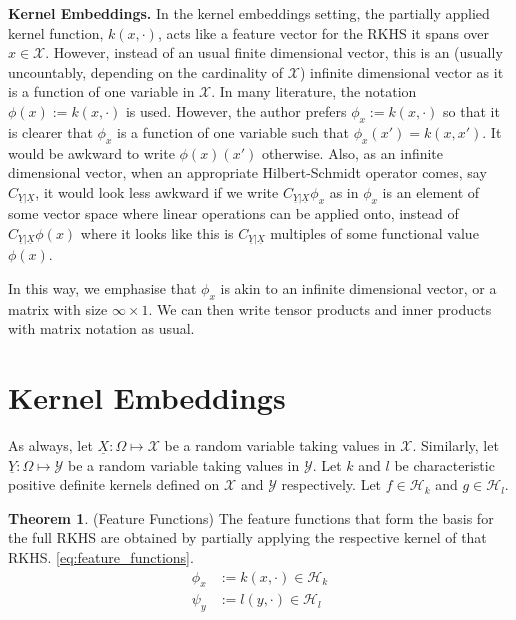 \documentclass[twoside]{article} \usepackage{aistats2017}
\theoremstyle{definition}
\newtheorem{theorem}{Theorem}[section]
\newcommand{\rv}[1]{\underline{#1}}
\newcommand{\Hk}{\mathcal{H}_{k}}
\newcommand{\Hl}{\mathcal{H}_{l}}
\begin{document}
	\textbf{Kernel Embeddings.} In the kernel embeddings setting, the partially applied kernel function, $k(x, \cdot)$, acts like a feature vector for the RKHS it spans over $x \in \mathcal{X}$. However, instead of an usual finite dimensional vector, this is an (usually uncountably, depending on the cardinality of $\mathcal{X}$) infinite dimensional vector as it is a function of one variable in $\mathcal{X}$. In many literature, the notation $\phi(x) := k(x, \cdot)$ is used. However, the author prefers $\phi_{x} := k(x, \cdot)$ so that it is clearer that $\phi_{x}$ is a function of one variable such that $\phi_{x}(x') = k(x, x')$. It would be awkward to write $\phi(x)(x')$ otherwise. Also, as an infinite dimensional vector, when an appropriate Hilbert-Schmidt operator comes, say $C_{\rv{Y} | \rv{X}}$, it would look less awkward if we write $C_{\rv{Y} | \rv{X}} \phi_{x}$ as in $\phi_{x}$ is an element of some vector space where linear operations can be applied onto, instead of $C_{\rv{Y} | \rv{X}} \phi(x)$ where it looks like this is $C_{\rv{Y} | \rv{X}}$ multiples of some functional value $\phi(x)$.
	
	In this way, we emphasise that $\phi_{x}$ is akin to an infinite dimensional vector, or a matrix with size $\infty \times 1$. We can then write tensor products and inner products with matrix notation as usual.
	
\section{Kernel Embeddings}
	
	As always, let $\rv{X} : \Omega \mapsto \mathcal{X}$ be a random variable taking values in $\mathcal{X}$. Similarly, let $\rv{Y} : \Omega \mapsto \mathcal{Y}$ be a random variable taking values in $\mathcal{Y}$. Let $k$ and $l$ be characteristic positive definite kernels defined on $\mathcal{X}$ and $\mathcal{Y}$ respectively. Let $f \in \Hk$ and $g \in \Hl$.
		

	\begin{theorem} \label{thm:feature_functions}
		(Feature Functions)
		The feature functions that form the basis for the full RKHS are obtained by partially applying the respective kernel of that RKHS. \eqref{eq:feature_functions}.
		\begin{equation}
		\begin{aligned}
			\phi_{x} &:= k(x, \cdot) \in \Hk \\
			\psi_{y} &:= l(y, \cdot) \in \Hl
		\label{eq:feature_functions}
		\end{aligned}
		\end{equation}
	\end{theorem}
\end{document}
